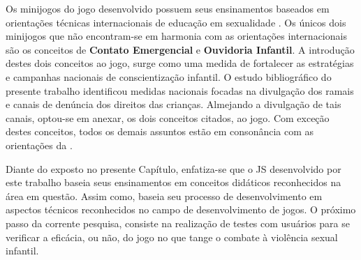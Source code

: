 Os minijogos do jogo desenvolvido possuem seus ensinamentos baseados em orientações técnicas internacionais de educação em sexualidade \cite{unesco2018international}. Os únicos dois minijogos que não encontram-se em harmonia com as orientações internacionais são os conceitos de \textbf{Contato Emergencial} e \textbf{Ouvidoria Infantil}. A introdução destes dois conceitos ao jogo, surge como uma medida de fortalecer as estratégias e campanhas nacionais de conscientização infantil. O estudo bibliográfico do presente trabalho identificou medidas nacionais focadas na divulgação dos ramais e canais de denúncia dos direitos das crianças. Almejando a divulgação de tais canais, optou-se em anexar, os dois conceitos citados, ao jogo. Com exceção destes conceitos, todos os demais assuntos estão em consonância com as orientações da . 

Diante do exposto no presente Capítulo, enfatiza-se que o \ac{JS} desenvolvido por este trabalho baseia seus ensinamentos em conceitos didáticos reconhecidos na área em questão. Assim como, baseia seu processo de desenvolvimento em aspectos técnicos reconhecidos no campo de desenvolvimento de jogos. O próximo passo da corrente pesquisa, consiste na realização de testes com usuários para se verificar a eficácia, ou não, do jogo no que tange o combate à violência sexual infantil. 